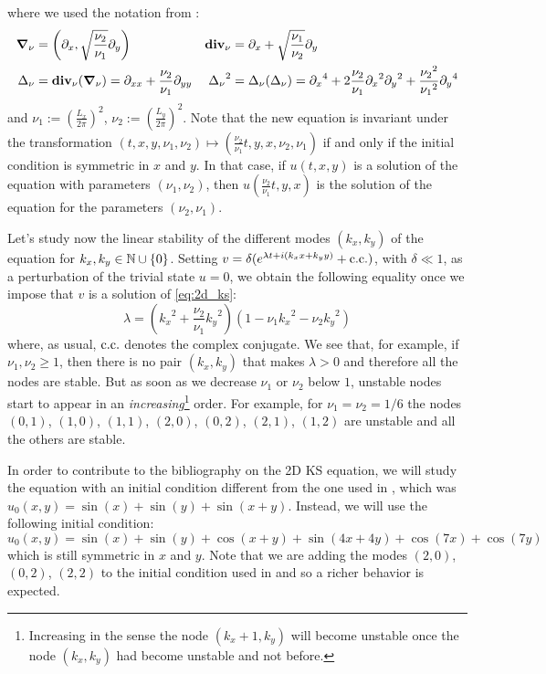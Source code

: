 \documentclass[twoside]{article}
\begin{document}
where we used the notation from \cite{Kalogirou2015}:
\begin{align}
  \grad_\nu & = \left(\partial_x , \sqrt{\frac{\nu_2}{\nu_1}} \partial_y
  \right)   & \operatorname{\boldsymbol{\mathrm{div}}}_\nu                                                   & = \partial_x + \sqrt{\frac{\nu_1}{\nu_2}} \partial_y
  \\ \Delta_\nu &= \operatorname{\boldsymbol{\mathrm{div}}}_\nu(\grad_\nu) = \partial_{xx} + \frac{\nu_2}{\nu_1} \partial_{yy} & {\Delta_\nu}^2 &= \Delta_\nu(\Delta_\nu) = {\partial_{x}}^4 + 2 \frac{\nu_2}{\nu_1} {\partial_{x}}^2{\partial_{y}}^2 + \frac{{\nu_2}^2}{{\nu_1}^2} {\partial_{y}}^4
\end{align}
and $\nu_1 :={\left( \frac{L_x}{2\pi} \right)}^2$, $\nu_2 := {\left( \frac{L_y}{2\pi} \right)}^2$. Note that the new equation is invariant under the transformation $(t,x,y, \nu_1, \nu_2) \mapsto \left( \frac{\nu_2}{\nu_1} t, y, x, \nu_2, \nu_1 \right)$ if and only if the initial condition is symmetric in $x$ and $y$. In that case, if $u(t,x,y)$ is a solution of the equation with parameters $(\nu_1, \nu_2)$, then $u\left( \frac{\nu_2}{\nu_1} t, y, x \right)$ is the solution of the equation for the parameters $(\nu_2, \nu_1)$.

Let's study now the linear stability of the different modes $(k_x, k_y)$ of the equation for $k_x,k_y\in\mathbb{N}\cup\{0\}$. Setting $v = \delta(e^{\lambda t+i(k_x x + k_y y)} + \mathrm{c.c.})$, with $\delta \ll 1$, as a perturbation of the trivial state $u = 0$, we obtain the following equality once we impose that $v$ is a solution of \cref{eq:2d_ks}:
\begin{equation}
  \lambda = \left({k_x}^2+ \frac{\nu_2}{\nu_1} {k_y}^2\right)\left( 1 - \nu_1{k_x}^2 - \nu_2{k_y}^2\right)
\end{equation}
where, as usual, $\mathrm{c.c.}$ denotes the complex conjugate.
We see that, for example, if $\nu_1, \nu_2 \geq 1$, then there is no pair $(k_x, k_y)$ that makes $\lambda > 0$ and therefore all the nodes are stable. But as soon as we decrease $\nu_1$ or $\nu_2$ below $1$, unstable nodes start to appear in an \emph{increasing}\footnote{Increasing in the sense the node $(k_x+1,k_y)$ will become unstable once the node $(k_x,k_y)$ had become unstable and not before.} order. For example, for $\nu_1=\nu_2=1/6$ the nodes $(0,1)$, $(1,0)$, $(1,1)$, $(2,0)$, $(0,2)$, $(2,1)$, $(1,2)$ are unstable and all the others are stable.

In order to contribute to the bibliography on the 2D KS equation, we will study the equation with an initial condition different from the one used in \cite{Kalogirou2015}, which was $u_0(x,y) = \sin(x) + \sin(y) + \sin(x+y)$. Instead, we will use the following initial condition:
\begin{equation}\label{eq:initial_condition}
  u_0(x,y) = \sin(x) + \sin(y) + \cos(x+y) + \sin(4x+4y) + \cos(7x) + \cos(7y)
\end{equation}
which is still symmetric in $x$ and $y$. Note that we are adding the modes $(2,0)$, $(0,2)$, $(2,2)$ to the initial condition used in \cite{Kalogirou2015} and so a richer behavior is expected.
\end{document}
